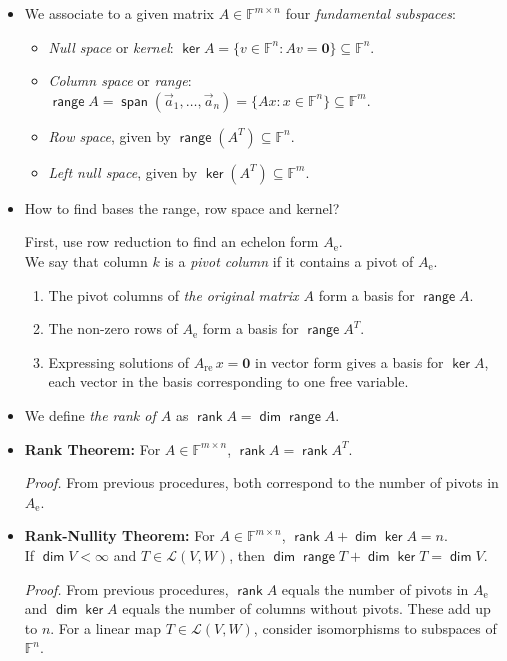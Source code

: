 \documentclass[11pt]{article}
\newcommand{\1}{\mathbf{1}}
\newcommand{\e}{{\mathrm{e}}}
\newcommand{\re}{{\mathrm{re}}}
\newcommand{\0}{\mathbf{0}}
\newcommand{\F}{\mathbb{F}}
\newcommand{\cL}{\mathcal{L}}
\DeclareMathOperator{\myspan}{\mathsf{span}}
\DeclareMathOperator{\myrange}{\mathsf{range}}
\DeclareMathOperator{\myker}{\mathsf{ker}}
\DeclareMathOperator{\mydim}{\mathsf{dim}}
\DeclareMathOperator{\myrank}{\mathsf{rank}}
\newcommand{\va}{\vec{a}}
\begin{document}
\begin{itemize}

\item

We associate to a given matrix $A\in\F^{m \times n}$ four \emph{fundamental subspaces}:
\begin{itemize}
\item
\emph{Null space} or \emph{kernel}:
$\myker A = \{v \in \F^n: Av=\0\} \subseteq \F^n$.
\item
\emph{Column space} or \emph{range}:
$\myrange A = \myspan(\va_1,\dots,\va_n) = \{Ax : x\in \F^n\} \subseteq \F^m$.
\item
\emph{Row space}, given by $\myrange(A^T) \subseteq \F^n$.
\item
\emph{Left null space}, given by $\myker(A^T) \subseteq \F^m$.
\end{itemize}

\item

How to find bases the range, row space and kernel?

First, use row reduction to find an echelon form $A_\e$.
\\
We say that column $k$ is a \emph{pivot column} if it contains a pivot of $A_\e$.
\begin{enumerate}
\item
The pivot columns of \emph{the original matrix $A$} form a basis for $\myrange A$.
\item
The non-zero rows of $A_\e$ form a basis for $\myrange A^T$.
\item
Expressing solutions of $A_\re \, x = \0$ in vector form gives a basis for $\myker A$, each vector in the basis corresponding to one free variable.
\end{enumerate}

\item

We define \emph{the rank of $A$} as $\myrank A = \mydim \myrange A$.

\item

\textbf{Rank Theorem:}
For $A \in \F^{m \times n}$,
$\myrank A = \myrank A^T$.

\emph{Proof.}
From previous procedures, both correspond to the number of pivots in $A_\e$.

\item

\textbf{Rank-Nullity Theorem:}
For $A \in \F^{m \times n}$,
$\myrank A + \mydim \myker A = n$.
\\
\hspace*{\fill}
If $\mydim V<\infty$ and $T\in\cL(V,W)$, then
$\mydim\myrange T + \mydim \myker T = \mydim V$.

\emph{Proof.}
From previous procedures, $\myrank A$ equals the number of pivots in $A_{\e}$ and $\mydim \myker A$ equals the number of columns without pivots. These add up to $n$.
For a linear map $T\in\cL(V,W)$, consider isomorphisms to subspaces of $\F^n$.

\end{itemize}
\end{document}
